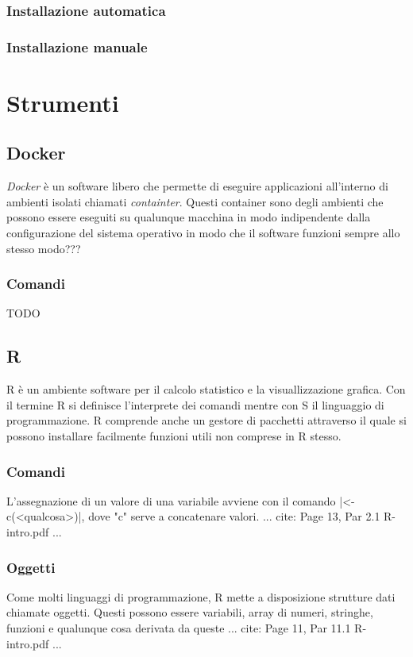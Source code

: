 \documentclass[10pt,titlepage,twoside,a4paper]{report}
\begin{document}
        \subsection{Installazione automatica}
        \subsection{Installazione manuale}



\chapter{Strumenti}


    \section{Docker}
\emph{Docker} è un software libero che permette di eseguire applicazioni 
all'interno di ambienti isolati chiamati
\emph{containter}. Questi container sono degli ambienti che 
possono essere eseguiti su qualunque macchina in modo indipendente dalla 
configurazione del sistema operativo in modo che il software 
funzioni sempre allo stesso modo???\cite{docker}

        \subsection{Comandi}
TODO



    \section{R}
R è un ambiente software per il calcolo statistico e la 
visuallizzazione grafica. Con il termine R si definisce l'interprete
dei comandi mentre con S il linguaggio di programmazione. R comprende anche un 
gestore di pacchetti attraverso il quale si possono installare facilmente
funzioni utili non comprese in R stesso.

        \subsection{Comandi}
L'assegnazione di un valore di una variabile avviene con il 
comando |<- c(<qualcosa>)|, dove "c" serve a concatenare valori.
... cite: Page 13, Par 2.1 R-intro.pdf ...

        \subsection{Oggetti}
Come molti linguaggi di programmazione, R mette a disposizione strutture dati 
chiamate oggetti. Questi possono essere variabili, array di numeri, stringhe, 
funzioni e qualunque cosa derivata da queste ... cite: Page 11, Par 11.1 
R-intro.pdf ...
\end{document}
